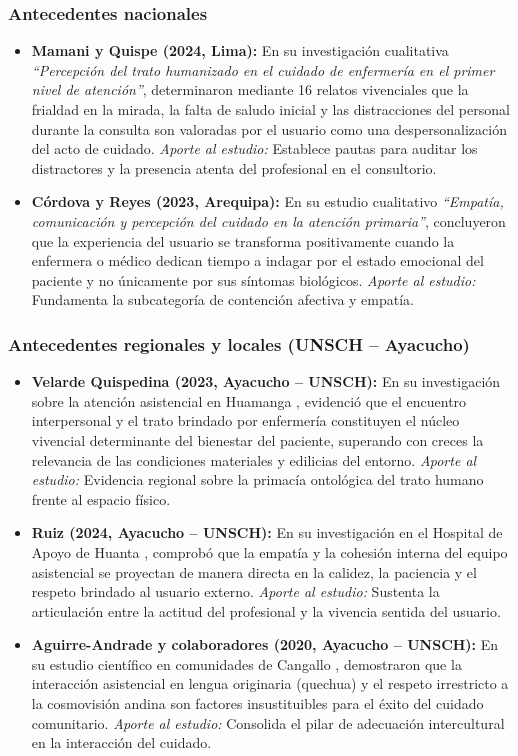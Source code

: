 \subsubsection{Antecedentes nacionales}
\label{sec:3.1.2_nacionales}
\begin{itemize}
    \item \textbf{Mamani y Quispe (2024, Lima):} En su investigación cualitativa \textit{``Percepción del trato humanizado en el cuidado de enfermería en el primer nivel de atención''}, determinaron mediante 16 relatos vivenciales que la frialdad en la mirada, la falta de saludo inicial y las distracciones del personal durante la consulta son valoradas por el usuario como una despersonalización del acto de cuidado. \textit{Aporte al estudio:} Establece pautas para auditar los distractores y la presencia atenta del profesional en el consultorio.
    \item \textbf{Córdova y Reyes (2023, Arequipa):} En su estudio cualitativo \textit{``Empatía, comunicación y percepción del cuidado en la atención primaria''}, concluyeron que la experiencia del usuario se transforma positivamente cuando la enfermera o médico dedican tiempo a indagar por el estado emocional del paciente y no únicamente por sus síntomas biológicos. \textit{Aporte al estudio:} Fundamenta la subcategoría de contención afectiva y empatía.
\end{itemize}

\subsubsection{Antecedentes regionales y locales (UNSCH -- Ayacucho)}
\label{sec:3.1.3_locales}
\begin{itemize}
    \item \textbf{Velarde Quispedina (2023, Ayacucho -- UNSCH):} En su investigación sobre la atención asistencial en Huamanga \cite{velarde2023}, evidenció que el encuentro interpersonal y el trato brindado por enfermería constituyen el núcleo vivencial determinante del bienestar del paciente, superando con creces la relevancia de las condiciones materiales y edilicias del entorno. \textit{Aporte al estudio:} Evidencia regional sobre la primacía ontológica del trato humano frente al espacio físico.
    \item \textbf{Ruiz (2024, Ayacucho -- UNSCH):} En su investigación en el Hospital de Apoyo de Huanta \cite{ruiz2024}, comprobó que la empatía y la cohesión interna del equipo asistencial se proyectan de manera directa en la calidez, la paciencia y el respeto brindado al usuario externo. \textit{Aporte al estudio:} Sustenta la articulación entre la actitud del profesional y la vivencia sentida del usuario.
    \item \textbf{Aguirre-Andrade y colaboradores (2020, Ayacucho -- UNSCH):} En su estudio científico en comunidades de Cangallo \cite{aguirre2020}, demostraron que la interacción asistencial en lengua originaria (quechua) y el respeto irrestricto a la cosmovisión andina son factores insustituibles para el éxito del cuidado comunitario. \textit{Aporte al estudio:} Consolida el pilar de adecuación intercultural en la interacción del cuidado.
\end{itemize}

